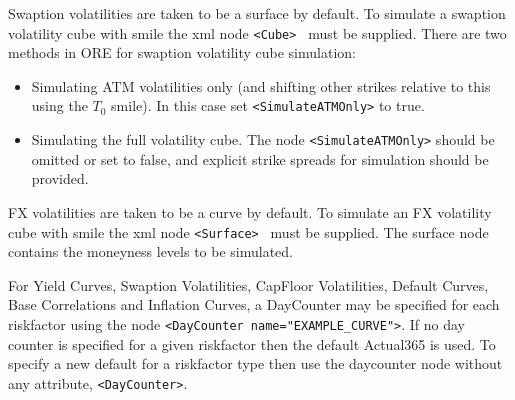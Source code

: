 \documentclass[12pt, a4paper]{article}
\begin{document}
{{Swaption volatilities are taken to be a surface by default. To simulate a swaption volatility cube with smile the xml node {\tt <Cube> } must be supplied.
There are two methods in ORE for swaption volatility cube simulation: 
\begin{itemize}
\item Simulating ATM volatilities only (and shifting other strikes relative to this using the $T_{0}$ smile). In this case set {\tt <SimulateATMOnly>} to true.
\item Simulating the full volatility cube. The node {\tt <SimulateATMOnly>} should be omitted or set to false, and explicit strike spreads for simulation should be provided.
\end{itemize}

FX volatilities are taken to be a curve by default. To simulate an FX volatility cube with smile the xml node {\tt <Surface> } must be supplied. The surface node contains the moneyness levels to be simulated.

For Yield Curves, Swaption Volatilities, CapFloor Volatilities, Default Curves, Base Correlations and Inflation Curves, a DayCounter may be specified for each riskfactor using the node {\tt <DayCounter name="EXAMPLE\_CURVE">}.  
If no day counter is specified for a given riskfactor then the default Actual365 is used. To specify a new default for a riskfactor type then use the daycounter node without any attribute,  {\tt <DayCounter>}. 

}}
\end{document}
